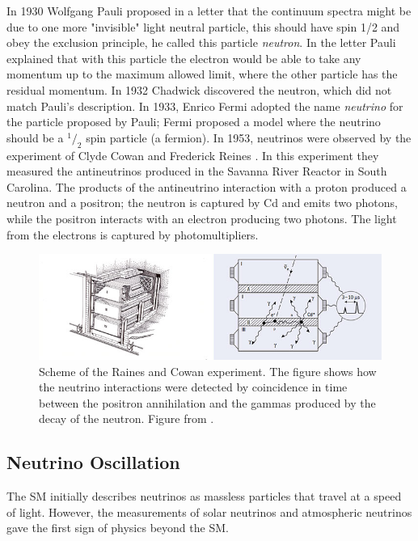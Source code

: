 In 1930 Wolfgang Pauli \cite{NeutrinoHistory} proposed in a letter that the continuum spectra might be due to one more "invisible" light neutral particle, this should have spin 1/2 and obey the exclusion principle, he called this particle \textit{neutron}. In the letter Pauli explained that with this particle the electron would be able to take any momentum up to the maximum allowed limit, where the other particle has the residual momentum. In 1932 Chadwick discovered the neutron, which did not match Pauli's description. In 1933, Enrico Fermi adopted the name \textit{neutrino} for the particle proposed by Pauli; Fermi proposed a model where the neutrino should be a $^1/_2$ spin particle (a fermion). In 1953, neutrinos were observed by the experiment of Clyde Cowan and Frederick Reines \cite{CowanReinesdoi:10.1126/science.124.3212.103}\cite{ReinesCowanPhysRev.92.830}. In this experiment they measured the antineutrinos produced in the Savanna River Reactor in South Carolina. The products of the antineutrino interaction with a proton produced a neutron and a positron; the neutron is captured by Cd and emits two photons, while the positron interacts with an electron producing two photons. The light from the electrons is captured by photomultipliers.

\begin{figure}
    \centering
    \includegraphics[scale=0.5]{Figures/Chapter1/RainesCowanExperiment.jpg}
    \caption{Scheme of the Raines and Cowan experiment. The figure shows how the neutrino interactions were detected by coincidence in time between the positron annihilation and the gammas produced by the decay of the neutron. Figure from \cite{ReinesCowanScheme}.}
    \label{fig:RainesCowanExperiment}
\end{figure}

\subsection{Neutrino Oscillation}
\label{Cap:Int:NuOscillation}

The SM initially describes neutrinos as massless particles that travel at a speed of light. However, the measurements of solar neutrinos and atmospheric neutrinos gave the first sign of physics beyond the SM.

